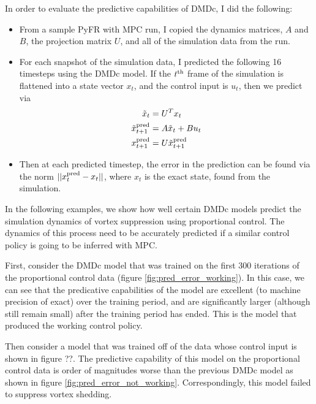 \documentclass{article}
\begin{document}
In order to evaluate the predictive capabilities of DMDc, I did the following:
\begin{itemize}
  \item From a sample PyFR with MPC run, I copied the dynamics matrices, $A$ and $B$, the projection matrix $U$, and all of the simulation data from the run.
  \item For each snapshot of the simulation data, I predicted the following 16 timesteps using the DMDc model. If the $t^{\rm th}$ frame of the simulation is flattened into a state vector $x_t$, and the control input is $u_t$, then we predict via
\begin{align*}
\tilde{x}_t &= U^T x_t \\
\tilde{x}^{\rm pred}_{t+1} &= A \tilde{x}_t + B u_t \\
x^{\rm pred}_{t+1} &= U \tilde{x}^{\rm pred}_{t+1}
\end{align*}

\item Then at each predicted timestep, the error in the prediction can be found via the norm $|| x^{\rm pred}_{t} - x_t ||$, where $x_t$ is the exact state, found from the simulation.

\end{itemize}

In the following examples, we show how well certain DMDc models predict the simulation dynamics of vortex suppression using proportional control. The dynamics of this process need to be accurately predicted if a similar control policy is going to be inferred with MPC.

First, consider the DMDc model that was trained on the first 300 iterations of the proportional control data (figure \ref{fig:pred_error_working}). In this case, we can see that the predicative capabilities of the model are excellent (to machine precision of exact) over the training period, and are significantly larger (although still remain small) after the training period has ended. This is the model that produced the working control policy.

Then consider a model that was trained off of the data whose control input is shown in figure ??. The predictive capability of this model on the proportional control data is order of magnitudes worse than the previous DMDc model as shown in figure \ref{fig:pred_error_not_working}. Correspondingly, this model failed to suppress vortex shedding.
\end{document}
